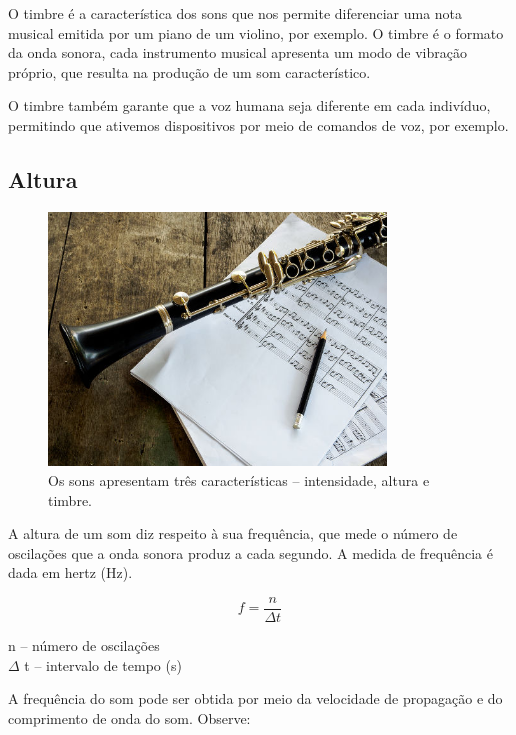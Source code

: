 \documentclass[
	article,		
	11pt,			
	oneside,		
	a4paper,			
	english,			
	brazil			
]{abntex2}
\begin{document}
O timbre é a característica dos sons que nos permite diferenciar uma nota musical emitida por um piano de um violino, por exemplo. O timbre é o formato da onda sonora, cada instrumento musical apresenta um modo de vibração próprio, que resulta na produção de um som característico.

O timbre também garante que a voz humana seja diferente em cada indivíduo, permitindo que ativemos dispositivos por meio de comandos de voz, por exemplo.

\subsection{Altura}

\begin{figure}[h]
    \includegraphics[width=0.80\textwidth]{./imagens/caracateristicas-dos-sons.jpg}
    \centering
    \caption{Os sons apresentam três características – intensidade, altura e timbre.}
    \label{fig:CaracteriasticaDoSom}
\end{figure}

A altura de um som diz respeito à sua frequência, que mede o número de oscilações que a onda sonora produz a cada segundo. A medida de frequência é dada em hertz (Hz).

\begin{equation}
    f = \frac{n}{\Delta t}
\end{equation}

\begin{center}
    n – número de oscilações\\
    {$\Delta$} t – intervalo de tempo (s)
\end{center}

A frequência do som pode ser obtida por meio da velocidade de propagação e do comprimento de onda do som. Observe:
\end{document}
